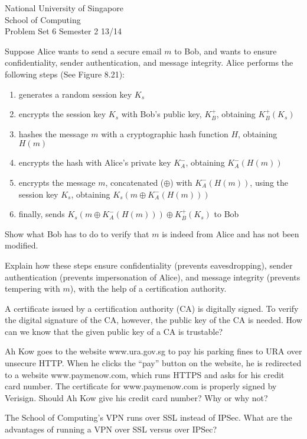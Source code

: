 \documentclass[a4paper,11pt]{exam}
\begin{document}
    \extraheadheight{.5in}
    {\large\sf National University of Singapore\\ School of Computing \\
    \LARGE\sf Problem Set 6}%
    {\large\sf Semester 2 13/14}
    \firstpageheadrule
    \pagestyle{headandfoot}

    \begin{questions}

\question Suppose Alice wants to send a secure email $m$ to Bob, and wants to ensure confidentiality, sender authentication, and message integrity.  Alice performs the following steps (See Figure 8.21):
\begin{enumerate}
	\item generates a random session key $K_s$ 
	\item encrypts the session key $K_s$ with Bob's public key, $K_B^+$, obtaining $K_B^+(K_s)$
	\item hashes the message $m$ with a cryptographic hash function $H$, obtaining $H(m)$  \label{hash}
	\item encrypts the hash with Alice's private key $K_A^-$, obtaining $K_A^-(H(m))$ \label{private}
	\item encrypts the message $m$, concatenated ($\oplus$) with $K_A^-(H(m))$, using the session key $K_s$, obtaining $K_s(m \oplus K_A^-(H(m)))$
	\item finally, sends $K_s(m \oplus K_A^-(H(m))) \oplus K_B^+(K_s)$ to Bob
\end{enumerate}

Show what Bob has to do to verify that $m$ is indeed from Alice and has not been modified.

Explain how these steps ensure confidentiality (prevents eavesdropping), sender authentication (prevents impersonation of Alice), and message integrity (prevents tempering with $m$), with the help of a certification authority.

\question A certificate issued by a certification authority (CA) is digitally signed.  To verify the digital signature of the CA, however, the public key of the CA is needed.  How can we know that the given public key of a CA is trustable?

\question Ah Kow goes to the website www.ura.gov.sg to pay his parking fines to URA over unsecure HTTP.  When he clicks the ``pay'' button on the website, he is redirected to a website www.paymenow.com, which runs HTTPS and asks for his credit card number.  The certificate for www.paymenow.com is properly signed by Verisign.  Should Ah Kow give his credit card number?  Why or why not?

\question The School of Computing's VPN runs over SSL instead of IPSec.  
What are the advantages of running a VPN over SSL versus over IPSec?  

\end{questions}
\end{document}
